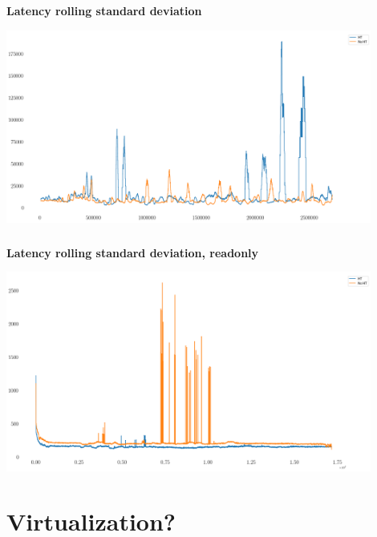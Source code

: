 \documentclass[usenames,dvipsnames, 18pt, compress, aspectratio=169]{beamer}
\begin{document}
\begin{frame}
    \frametitle{}
    \begin{center}
    \textbf{Latency rolling standard deviation}

        \includegraphics[width=0.9\textwidth,center]{hyperthreading.png}

    \end{center}
\end{frame}

\begin{frame}
    \frametitle{}
    \begin{center}
    \textbf{Latency rolling standard deviation, readonly}

        \includegraphics[width=0.9\textwidth,center]{hyperthreading_readonly.png}

    \end{center}
\end{frame}

\fontsize{13pt}{14}\selectfont
\section{Virtualization?}
\fontsize{17pt}{18}\selectfont
\end{document}
